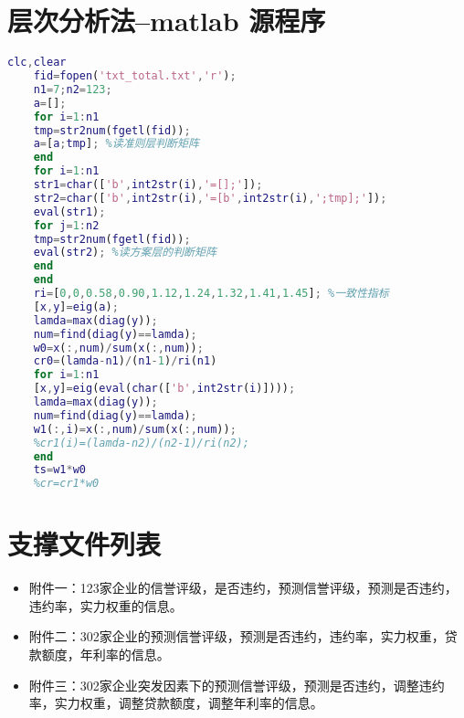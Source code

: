 \documentclass{cumcmthesis}
\begin{document}
\newpage
\begin{appendices}


\section{层次分析法--matlab 源程序}

\begin{lstlisting}[language=matlab]
    clc,clear
    fid=fopen('txt_total.txt','r');
    n1=7;n2=123;
    a=[];
    for i=1:n1
    tmp=str2num(fgetl(fid));
    a=[a;tmp]; %读准则层判断矩阵
    end
    for i=1:n1
    str1=char(['b',int2str(i),'=[];']);
    str2=char(['b',int2str(i),'=[b',int2str(i),';tmp];']);
    eval(str1);
    for j=1:n2
    tmp=str2num(fgetl(fid));
    eval(str2); %读方案层的判断矩阵
    end
    end
    ri=[0,0,0.58,0.90,1.12,1.24,1.32,1.41,1.45]; %一致性指标
    [x,y]=eig(a);
    lamda=max(diag(y));
    num=find(diag(y)==lamda);
    w0=x(:,num)/sum(x(:,num));
    cr0=(lamda-n1)/(n1-1)/ri(n1)
    for i=1:n1
    [x,y]=eig(eval(char(['b',int2str(i)])));
    lamda=max(diag(y));
    num=find(diag(y)==lamda);
    w1(:,i)=x(:,num)/sum(x(:,num));
    %cr1(i)=(lamda-n2)/(n2-1)/ri(n2);
    end
    ts=w1*w0
    %cr=cr1*w0
 \end{lstlisting}
 \section{支撑文件列表}
 \begin{itemize}
     \item 附件一：123家企业的信誉评级，是否违约，预测信誉评级，预测是否违约，违约率，实力权重的信息。
     \item 附件二：302家企业的预测信誉评级，预测是否违约，违约率，实力权重，贷款额度，年利率的信息。
     \item 附件三：302家企业突发因素下的预测信誉评级，预测是否违约，调整违约率，实力权重，调整贷款额度，调整年利率的信息。
 \end{itemize}
\end{appendices}
\end{document}
